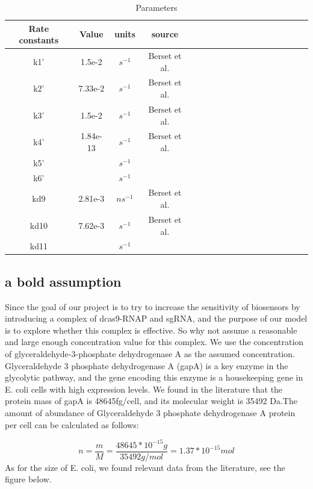 \begin{table}[htbp]
	\centering
	\caption{\label {tab:test} Parameters}
	\begin{tabular}{cccccccccccccccccc}
		\toprule
		Rate constants & Value& units & source \\
		\midrule
		k1' & 1.5e-2&$s^{-1} $& Berset et al. \\
		k2' & 7.33e-2 &$s^{-1} $& Berset et al.\\
		k3' & 1.5e-2 & $s^{-1}$ & Berset et al.\\
		k4' &1.84e-13&$s^{-1}$& Berset et al.\\
		k5'&  &$s^{-1}$&  \\
		k6' &    & $s^{-1}$ &   \\
		kd9&2.81e-3  & $ns^{-1}$ & Berset et al.  \\
		kd10  &7.62e-3 &$s^{-1}$ & Berset et al. \\
		kd11& & $s^{-1}$& \\
		
		\bottomrule
	\end{tabular}
\end{table}

\subsection{a bold assumption}
Since the goal of our project is to try to increase the sensitivity of biosensors by introducing a complex of dcas9-RNAP and sgRNA, and the purpose of our model is to explore whether this complex is effective. So why not assume a reasonable and large enough concentration value for this complex. We use the concentration of glyceraldehyde-3-phosphate dehydrogenase A as the assumed concentration. Glyceraldehyde 3 phosphate dehydrogenase A (gapA) is a key enzyme in the glycolytic pathway, and the gene encoding this enzyme is a housekeeping gene in E. coli cells with high expression levels. We found in the literature that the protein mass of gapA is 48645fg/cell, and its molecular weight is 35492 Da.The amount of abundance of Glyceraldehyde 3 phosphate dehydrogenase A protein per cell can be calculated as follows:

\begin{displaymath}
n=\frac{m}{M}=\frac{48645*10^{-15}g}{35492g/mol}=1.37*10^{-15}mol
\end{displaymath}
As for the size of E. coli, we found relevant data from the literature, see the figure below.

